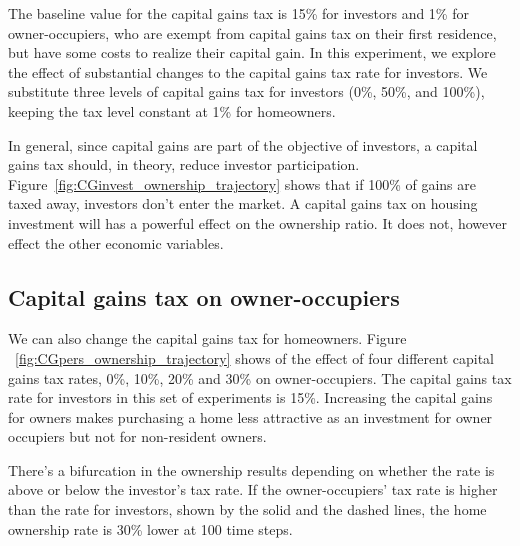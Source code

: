 The baseline value for the capital gains tax is 15\% for investors and 1\% for owner-occupiers, who are  exempt from capital gains tax on their first residence, but have some costs to realize their capital gain. In this experiment, we explore the effect of substantial changes to the capital gains tax rate for investors. 
We substitute three  levels  of capital gains tax for investors (0\%, 50\%, and 100\%), keeping the tax level constant at 1\% for homeowners.

In general, since capital gains are part of the objective of investors, a capital gains tax should, in theory, reduce investor participation. Figure~\ref{fig:CGinvest_ownership_trajectory} shows that if 100\% of gains are taxed away, investors don't enter the market. A capital gains tax on housing investment will has a powerful effect on the ownership ratio. It does not, however effect the other economic variables. %

\newpage
\subsection{Capital gains tax on owner-occupiers}
We can also change the capital gains tax for homeowners. 
Figure ~\ref{fig:CGpers_ownership_trajectory} shows of the effect of four different capital gains tax rates, 0\%, 10\%, 20\% and 30\% on owner-occupiers. The capital gains tax rate for investors in this set of experiments is 15\%. Increasing the capital gains for owners makes purchasing a home less attractive as an investment for owner occupiers but not for non-resident owners. %


There's a bifurcation in the ownership results depending on whether the rate is above or below the investor's tax rate.  If the  owner-occupiers' tax rate is higher than the rate for investors,  shown by the solid and the dashed lines,  the home ownership rate is  30\% lower at 100 time steps. 


